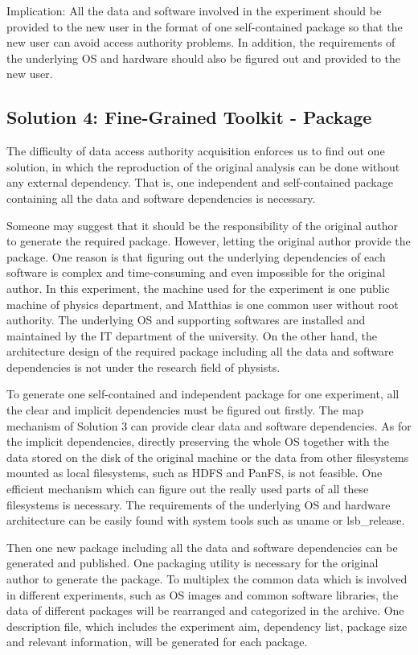 \documentclass{acm_proc_article-sp}
\begin{document}
Implication: All the data and software involved in the experiment should be
provided to the new user in the format of one self-contained package so that
the new user can avoid 
access authority problems.
In addition, the requirements of the underlying
OS and hardware should also be figured out and provided to the new user.

\subsection{Solution 4: Fine-Grained Toolkit - Package}
The difficulty of data access authority acquisition enforces us to find out one
solution, in which the reproduction of the original analysis can be done
without any external dependency. That is, one independent and self-contained
package containing all the data and software dependencies is necessary. 

Someone may suggest that it should be the responsibility of the original author
to generate the required package. However, letting the original author provide
the package. 
One reason is that figuring out the underlying dependencies of
each software is complex and time-consuming and even impossible for the
original author. In this experiment, the machine used for the experiment is one
public machine of physics department, and Matthias is one common user without
root authority. The underlying OS and supporting softwares are installed and
maintained by the IT department of the university. On the other hand, the
architecture design of the required package including all the data and software
dependencies is not under the research field of physists.

To generate one self-contained and independent package for one experiment, all
the clear and implicit dependencies must be figured out firstly. The map mechanism
of Solution 3 can provide clear data and software dependencies. As for the
implicit dependencies, directly preserving the whole OS together with the data
stored on the disk of the original machine or the data from other filesystems
mounted as local filesystems, such as HDFS and PanFS, is not feasible. One
efficient mechanism which can figure out the really used parts of all these
filesystems is necessary. The requirements of the underlying OS and hardware
architecture can be easily found with system tools such as uname or
lsb\_release.

Then one new package including all the data and software dependencies can be generated and published. 
One packaging utility is necessary for the original author to generate the package. 
To multiplex the common data which is involved in different experiments, such as OS images and common software libraries, the data of different packages will be rearranged and categorized in the archive.
One description file, which includes the experiment aim, dependency list,  package size and relevant information, will be generated for each package.
\end{document}
